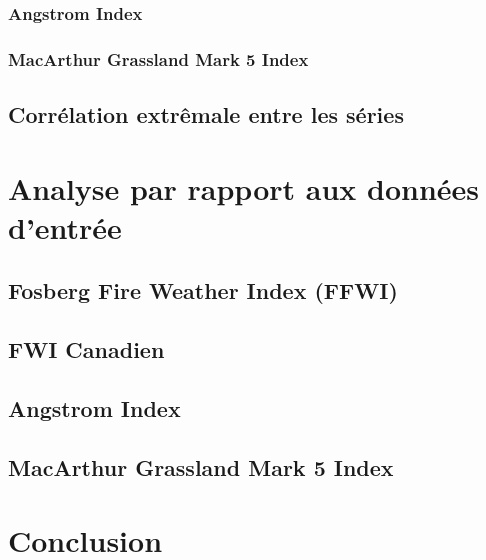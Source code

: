 \documentclass[
]{article}
\begin{document}
\hypertarget{angstrom-index-3}{%
\subsubsection{Angstrom Index}\label{angstrom-index-3}}

\hypertarget{macarthur-grassland-mark-5-index-3}{%
\subsubsection{MacArthur Grassland Mark 5
Index}\label{macarthur-grassland-mark-5-index-3}}

\hypertarget{corruxe9lation-extruxeamale-entre-les-suxe9ries}{%
\subsection{Corrélation extrêmale entre les
séries}\label{corruxe9lation-extruxeamale-entre-les-suxe9ries}}

\hypertarget{analyse-par-rapport-aux-donnuxe9es-dentruxe9e}{%
\section{Analyse par rapport aux données
d'entrée}\label{analyse-par-rapport-aux-donnuxe9es-dentruxe9e}}

\hypertarget{fosberg-fire-weather-index-ffwi-4}{%
\subsection{Fosberg Fire Weather Index
(FFWI)}\label{fosberg-fire-weather-index-ffwi-4}}

\hypertarget{fwi-canadien-4}{%
\subsection{FWI Canadien}\label{fwi-canadien-4}}

\hypertarget{angstrom-index-4}{%
\subsection{Angstrom Index}\label{angstrom-index-4}}

\hypertarget{macarthur-grassland-mark-5-index-4}{%
\subsection{MacArthur Grassland Mark 5
Index}\label{macarthur-grassland-mark-5-index-4}}

\hypertarget{conclusion}{%
\section{Conclusion}\label{conclusion}}
\end{document}
